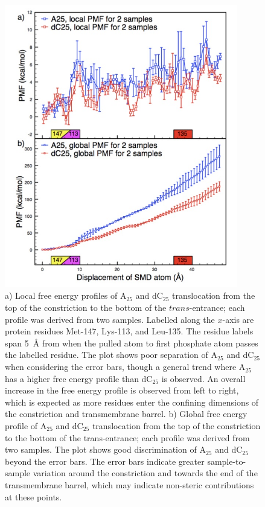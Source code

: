 \documentclass[a4paper,10pt]{article}
\newcommand{\dctf}{dC$_{25}$ }
\newcommand{\atf}{A$_{25}$ }
\begin{document}
\begin{figure}[!h]
  \begin{center}
    \includegraphics[width=4.0in]{full_trans_1every3_b}
  \end{center}
    \caption{a) Local free energy profiles of \atf and \dctf
translocation from the top of the constriction to the bottom of the
$trans$-entrance; each profile was derived from two samples. Labelled
along the $x$-axis are protein residues Met-147, Lys-113, and Leu-135.
The residue labels span 5~{\AA} from when the pulled atom to first
phosphate atom passes the labelled residue. The plot shows poor
separation of \atf and \dctf when considering the error bars, though a
general trend where \atf has a higher free energy profile than \dctf
is observed. An overall increase in the free energy profile is
observed from left to right, which is expected as more residues enter
the confining dimensions of the constriction and transmembrane
barrel. b) Global free energy profile of \atf and \dctf
translocation from the top of the constriction to the bottom of the
trans-entrance; each profile was derived from two samples. The plot
shows good discrimination of \atf and \dctf beyond the error bars. The
error bars indicate greater sample-to-sample variation around the
constriction and towards the end of the transmembrane barrel, which
may indicate non-steric contributions at these
points.}
  \label{full_trans_local}
\end{figure}
\end{document}
